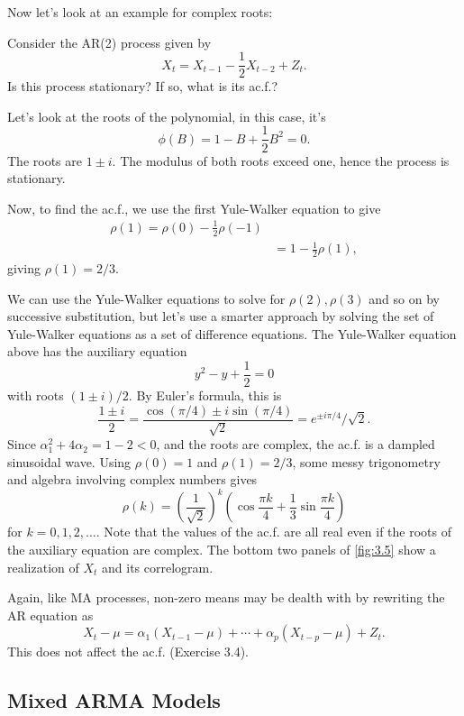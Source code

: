 Now let's look at an example for complex roots:
\begin{example}[]
\label{ex:3.1}
Consider the AR(2) process given by 
\[ X_t = X_{t-1} - \frac{1}{2}X_{t-2} + Z_t. \]
Is this process stationary? If so, what is its ac.f.?

Let's look at the roots of the polynomial, in this case, it's
\[ \phi(B) = 1 - B + \frac{1}{2}B^2 = 0. \]
The roots are $1 \pm i$. The modulus of both roots exceed one, hence the process is stationary.

Now, to find the ac.f., we use the first Yule-Walker equation to give 
\begin{align*}
	\rho(1) = \rho(0) - \frac{1}{2}\rho(-1) \\
	&= 1 - \frac{1}{2}\rho(1),
\end{align*}
giving $\rho(1) = 2/3$. 

We can use the Yule-Walker equations to solve for $\rho(2), \rho(3)$ and so on by successive substitution, but 
let's use a smarter approach by solving the set of Yule-Walker equations as a set of difference equations. The 
Yule-Walker equation above has the auxiliary equation 
\[ y^2 - y + \frac{1}{2} = 0 \]
with roots $(1 \pm i)/2$. By Euler's formula, this is 
\[ \frac{1 \pm i}{2} = \frac{\cos{(\pi/4)} \pm i \sin{(\pi/4)}}{\sqrt{2}} = e^{\pm i \pi/4} / \sqrt{2}. \]
Since $\alpha_1^2 + 4 \alpha_2 = 1 - 2 < 0$, and the roots are complex, the ac.f. is a dampled sinusoidal wave. 
Using $\rho(0) = 1$ and $\rho(1) = 2/3$, some messy trigonometry and algebra involving complex numbers gives 
\[ \rho(k) = \left( \frac{1}{\sqrt{2}} \right)^k \left( \cos{\frac{\pi k}{4}} + \frac{1}{3} 
\sin{\frac{\pi k}{4}} \right) \]
for $k = 0, 1, 2, \dots$. Note that the values of the ac.f. are all real even if the roots of the auxiliary 
equation are complex. The bottom two panels of \cref{fig:3.5} show a realization of $X_t$ and its correlogram.
\end{example}

Again, like MA processes, non-zero means may be dealth with by rewriting the AR equation as 
\[ X_t - \mu = \alpha_1 (X_{t-1} - \mu) + \cdots + \alpha_p (X_{t-p} - \mu) + Z_t. \]
This does not affect the ac.f. (Exercise 3.4).



\subsection{Mixed ARMA Models}


